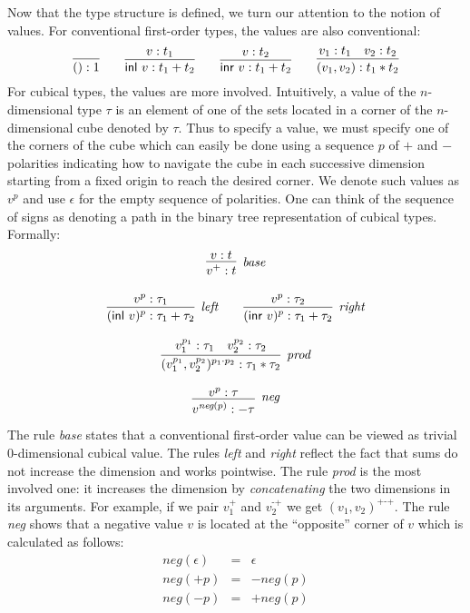 \documentclass[authoryear,preprint]{sigplanconf}
\newcommand{\mm}{\texttt{-}}
\newcommand{\pp}{\texttt{+}}
\newcommand{\negp}[1]{\textit{neg}(#1)}
\newcommand{\inl}[1]{\textsf{inl}~#1}
\newcommand{\inr}[1]{\textsf{inr}~#1}
\begin{document}
Now that the type structure is defined, we turn our attention to the notion
of values. For conventional first-order types, the values are also
conventional:
\[
\infer{() : 1}{} 
\qquad
\infer{\inl{v} : t_1 + t_2}{v : t_1}
\qquad
\infer{\inr{v} : t_1 + t_2}{v : t_2}
\qquad
\infer{(v_1,v_2) : t_1 * t_2}{v_1 : t_1 & v_2 : t_2}
\]
For cubical types, the values are more involved. Intuitively, a value of the
$n$-dimensional type $\tau$ is an element of one of the sets located in a
corner of the $n$-dimensional cube denoted by $\tau$. Thus to specify a
value, we must specify one of the corners of the cube which can easily be
done using a sequence $p$ of $+$ and $-$ polarities indicating how to
navigate the cube in each successive dimension starting from a fixed origin
to reach the desired corner. We denote such values as $v^{p}$ and use
$\epsilon$ for the empty sequence of polarities. One can think of the
sequence of signs as denoting a path in the binary tree representation of
cubical types. Formally:
\[\begin{array}{c}
\infer[\textit{base}]{v^{+} : t}{v : t} \\
\\
\infer[\textit{left}]{(\inl{v})^{p} : \tau_1 + \tau_2}{v^{p} : \tau_1}
\qquad
\infer[\textit{right}]{(\inr{v})^{p} : \tau_1 + \tau_2}{v^{p} : \tau_2} \\
\\
\infer[\textit{prod}]{(v_1^{p_1},v_2^{p_2})^{p_1 \cdot p_2} : \tau_1 * \tau_2}
      {v_1^{p_1} : \tau_1 & v_2^{p_2} : \tau_2} \\
\\
\infer[\textit{neg}]{v^{\negp{p}} : - \tau}{v^p : \tau} 
\end{array}\]
The rule \textit{base} states that a conventional first-order value can be
viewed as trivial $0$-dimensional cubical value. The rules \textit{left} and
\textit{right} reflect the fact that sums do not increase the dimension and
works pointwise. The rule \textit{prod} is the most involved one: it
increases the dimension by \emph{concatenating} the two dimensions in its
arguments. For example, if we pair $v_1^{\pp}$ and $v_2^{\mm\pp}$ we get
$(v_1,v_2)^{\pp\mm\pp}$. The rule \textit{neg} shows that a negative value
$v$ is located at the ``opposite'' corner of $v$ which is calculated as
follows:
\[\begin{array}{rcl}
\negp{\epsilon} &=& \epsilon \\
\negp{+p} &=& -\negp{p} \\
\negp{-p} &=& +\negp{p}
\end{array}\]
\end{document}
